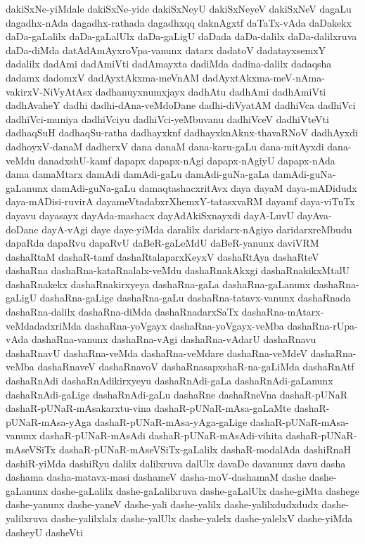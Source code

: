 {dakiSxNe-yiMdale
dakiSxNe-yide
dakiSxNeyU
dakiSxNeyeV
dakiSxNeV
dagaLu
dagadhx-nAda
dagadhx-rathada
dagadhxqq
daknAgxtf
daTaTx-vAda
daDakekx
daDa-gaLalilx
daDa-gaLalUlx
daDa-gaLigU
daDada
daDa-dalilx
daDa-dalilxruva
daDa-diMda
datAdAmAyxroVpa-vanunx
datarx
dadatoV
dadatayxsemxY
dadalilx
dadAmi
dadAmiVti
dadAmayxta
dadiMda
dadina-dalilx
dadaqsha
dadamx
dadomxV
dadAyxtAkxma-meVnAM
dadAyxtAkxma-meV-nAma-vakirxV-NiVyAtAsx
dadhanuyxnumxjayx
dadhAtu
dadhAmi
dadhAmiVti
dadhAvaheY
dadhi
dadhi-dAna-veMdoDane
dadhi-diVyatAM
dadhiVca
dadhiVci
dadhiVci-muniya
dadhiVciyu
dadhiVci-yeMbuvanu
dadhiVceV
dadhiVteVti
dadhaqSuH
dadhaqSu-ratha
dadhayxknf
dadhayxknAknx-thavaRNoV
dadhAyxdi
dadhoyxV-danaM
dadherxV
dana
danaM
dana-karu-gaLu
dana-mitAyxdi
dana-veMdu
danadxshU-kamf
dapapx
dapapx-nAgi
dapapx-nAgiyU
dapapx-nAda
dama
damaMtarx
damAdi
damAdi-gaLu
damAdi-guNa-gaLa
damAdi-guNa-gaLanunx
damAdi-guNa-gaLu
damaqtashacxritAvx
daya
dayaM
daya-mADidudx
daya-mADisi-ruvirA
dayameVtadabxrXhemxY-tatasxvaRM
dayamf
daya-viTuTx
dayavu
dayasayx
dayAda-mashacx
dayAdAkiSxnayxdi
dayA-LuvU
dayAva-doDane
dayA-vAgi
daye
daye-yiMda
daralilx
daridarx-nAgiyo
daridarxreMbudu
dapaRda
dapaRvu
dapaRvU
daBeR-gaLeMdU
daBeR-yanunx
daviVRM
dashaRtaM
dashaR-tamf
dashaRtalaparxKeyxV
dashaRtAya
dashaRteV
dashaRna
dashaRna-kataRnalalx-veMdu
dashaRnakAkxgi
dashaRnakikxMtalU
dashaRnakekx
dashaRnakirxyeya
dashaRna-gaLa
dashaRna-gaLanunx
dashaRna-gaLigU
dashaRna-gaLige
dashaRna-gaLu
dashaRna-tatavx-vanunx
dashaRnada
dashaRna-dalilx
dashaRna-diMda
dashaRnadarxSaTx
dashaRna-mAtarx-veMdadadxriMda
dashaRna-yoVgayx
dashaRna-yoVgayx-veMba
dashaRna-rUpa-vAda
dashaRna-vanunx
dashaRna-vAgi
dashaRna-vAdarU
dashaRnavu
dashaRnavU
dashaRna-veMda
dashaRna-veMdare
dashaRna-veMdeV
dashaRna-veMba
dashaRnaveV
dashaRnavoV
dashaRnasapxshaR-na-gaLiMda
dashaRnAtf
dashaRnAdi
dashaRnAdikirxyeyu
dashaRnAdi-gaLa
dashaRnAdi-gaLanunx
dashaRnAdi-gaLige
dashaRnAdi-gaLu
dashaRne
dashaRneVna
dashaR-pUNaR
dashaR-pUNaR-mAsakarxtu-vina
dashaR-pUNaR-mAsa-gaLaMte
dashaR-pUNaR-mAsa-yAga
dashaR-pUNaR-mAsa-yAga-gaLige
dashaR-pUNaR-mAsa-vanunx
dashaR-pUNaR-mAsAdi
dashaR-pUNaR-mAsAdi-vihita
dashaR-pUNaR-mAseVSiTx
dashaR-pUNaR-mAseVSiTx-gaLalilx
dashaR-modalAda
dashiRnaH
dashiR-yiMda
dashiRyu
dalilx
dalilxruva
dalUlx
davaDe
davanunx
davu
dasha
dashama
dasha-matavx-masi
dashameV
dasha-moV-dashamaM
dashe
dashe-gaLanunx
dashe-gaLalilx
dashe-gaLalilxruva
dashe-gaLalUlx
dashe-giMta
dashege
dashe-yanunx
dashe-yaneV
dashe-yali
dashe-yalilx
dashe-yalilxdudxdudx
dashe-yalilxruva
dashe-yalilxlalx
dashe-yalUlx
dashe-yalelx
dashe-yalelxV
dashe-yiMda
dasheyU
dasheVti
}
